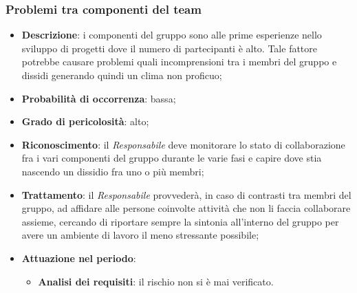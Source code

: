 		\subsubsection{Problemi tra componenti del team}
		\begin{itemize}
			\item \textbf{Descrizione}: i componenti del gruppo sono alle prime esperienze nello sviluppo di progetti dove il numero di partecipanti è alto. Tale fattore potrebbe causare problemi quali incomprensioni tra i membri del gruppo e dissidi generando quindi un clima non proficuo;
			\item \textbf{Probabilità di occorrenza}: bassa;
			\item \textbf{Grado di pericolosità}: alto;
			\item \textbf{Riconoscimento}: il \emph{Responsabile} deve monitorare lo stato di collaborazione fra i vari componenti del gruppo durante le varie fasi e capire dove stia nascendo un dissidio fra uno o più membri;
			\item \textbf{Trattamento}: il \emph{Responsabile} provvederà, in caso di contrasti tra membri del gruppo, ad affidare alle persone coinvolte attività che non li faccia collaborare assieme, cercando di riportare sempre la sintonia all'interno del gruppo per avere un ambiente di lavoro il meno stressante possibile;
			\item \textbf{Attuazione nel periodo}:
			\begin{itemize}
				\item \textbf{Analisi dei requisiti}: il rischio non si è mai verificato.
			\end{itemize}
		\end{itemize}
